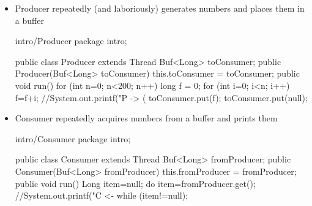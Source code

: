 \documentclass{concdistfoils}
\begin{document}
\begin{slide}
\begin{itemize}

\vfill

\item Producer repeatedly (and laboriously) generates numbers and places them in a buffer
\begin{hideclass}{intro/Producer}
package intro;
\end{hideclass}
\begin{class}{}
public class Producer extends Thread
{ Buf<Long> toConsumer;
  public Producer(Buf<Long> toConsumer) { this.toConsumer = toConsumer; }
  public void run() 
  { for (int n=0; n<200; n++)
    { long f = 0; 
      for (int i=0; i<n; i++) f=f+i;
      //System.out.printf("P -> (%
      toConsumer.put(f);
    }
    toConsumer.put(null);
  }
}
\end{class}
\end{itemize}
\end{slide}

\begin{slide}
\begin{itemize}
\item Consumer repeatedly acquires numbers from a buffer and prints them

\vfill
\begin{hideclass}{intro/Consumer}
package intro;
\end{hideclass}
\begin{class}{}
public class Consumer extends Thread
{ Buf<Long> fromProducer;
  public Consumer(Buf<Long> fromProducer) { this.fromProducer = fromProducer; }
  public void run() 
  { Long item=null; 
    do 
    { item=fromProducer.get(); 
      //System.out.printf("C <- %
    } while (item!=null); 
  }
}
\end{class}
\end{itemize}
\end{slide}
\end{document}
